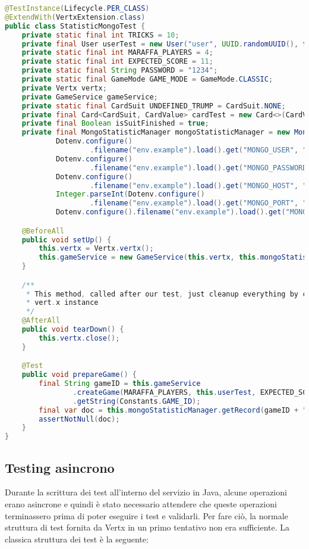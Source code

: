 \begin{lstlisting}[language=Java, caption={MongoDB integration Test}, label=list:mongo_test]
    @TestInstance(Lifecycle.PER_CLASS)
@ExtendWith(VertxExtension.class)
public class StatisticMongoTest {
	private static final int TRICKS = 10;
	private final User userTest = new User("user", UUID.randomUUID(), false);
	private static final int MARAFFA_PLAYERS = 4;
	private static final int EXPECTED_SCORE = 11;
	private static final String PASSWORD = "1234";
	private static final GameMode GAME_MODE = GameMode.CLASSIC;
	private Vertx vertx;
	private GameService gameService;
	private static final CardSuit UNDEFINED_TRUMP = CardSuit.NONE;
	private final Card<CardSuit, CardValue> cardTest = new Card<>(CardValue.THREE, CardSuit.CLUBS);
	private final Boolean isSuitFinished = true;
	private final MongoStatisticManager mongoStatisticManager = new MongoStatisticManager(
			Dotenv.configure()
					.filename("env.example").load().get("MONGO_USER", "user"),
			Dotenv.configure()
					.filename("env.example").load().get("MONGO_PASSWORD", "password"),
			Dotenv.configure()
					.filename("env.example").load().get("MONGO_HOST", "localhost"),
			Integer.parseInt(Dotenv.configure()
					.filename("env.example").load().get("MONGO_PORT", "27127")),
			Dotenv.configure().filename("env.example").load().get("MONGO_DATABASE", "maraffa-test"));

	@BeforeAll
	public void setUp() {
		this.vertx = Vertx.vertx();
		this.gameService = new GameService(this.vertx, this.mongoStatisticManager);
	}

	/**
	 * This method, called after our test, just cleanup everything by closing the
	 * vert.x instance
	 */
	@AfterAll
	public void tearDown() {
		this.vertx.close();
	}

	@Test
	public void prepareGame() {
		final String gameID = this.gameService
				.createGame(MARAFFA_PLAYERS, this.userTest, EXPECTED_SCORE, GAME_MODE.toString())
				.getString(Constants.GAME_ID);
		final var doc = this.mongoStatisticManager.getRecord(gameID + "-0");
		assertNotNull(doc);
	}
}
\end{lstlisting}
\vspace{1cm}

\subsection{Testing asincrono}

Durante la scrittura dei test all'interno del servizio in Java, alcune operazioni erano asincrone e quindi è stato necessario attendere che queste operazioni terminassero prima di poter eseguire i test e validarli.
Per fare ciò, la normale struttura di test fornita da Vertx in un primo tentativo non era sufficiente. La classica struttura dei test è la seguente:

